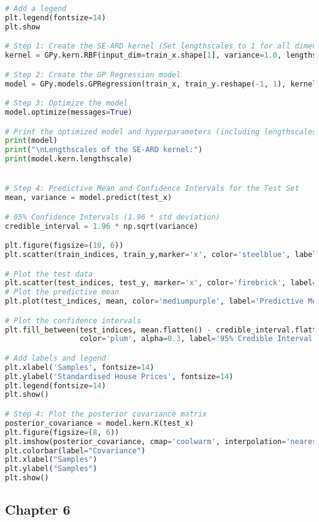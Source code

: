 \documentclass[12pt,a4paper]{article}
\begin{document}
\begin{lstlisting}[language=python, caption={Code of the Creation of Figure \ref{fig:SE-ARD categorical plots}}]
# Add a legend
plt.legend(fontsize=14)
plt.show

# Step 1: Create the SE-ARD kernel (Set lengthscales to 1 for all dimensions)
kernel = GPy.kern.RBF(input_dim=train_x.shape[1], variance=1.0, lengthscale=np.full(train_x.shape[1], 1), ARD=True)

# Step 2: Create the GP Regression model
model = GPy.models.GPRegression(train_x, train_y.reshape(-1, 1), kernel)

# Step 3: Optimize the model
model.optimize(messages=True)

# Print the optimized model and hyperparameters (including lengthscales)
print(model)
print("\nLengthscales of the SE-ARD kernel:")
print(model.kern.lengthscale)


# Step 4: Predictive Mean and Confidence Intervals for the Test Set
mean, variance = model.predict(test_x)

# 95% Confidence Intervals (1.96 * std deviation)
credible_interval = 1.96 * np.sqrt(variance)

plt.figure(figsize=(10, 6))
plt.scatter(train_indices, train_y,marker='x', color='steelblue', label='Training Data', s=50)

# Plot the test data
plt.scatter(test_indices, test_y, marker='x', color='firebrick', label='Test Data', s=50)
# Plot the predictive mean
plt.plot(test_indices, mean, color='mediumpurple', label='Predictive Mean', linewidth=3)

# Plot the confidence intervals
plt.fill_between(test_indices, mean.flatten() - credible_interval.flatten(), mean.flatten() + credible_interval.flatten(),
                 color='plum', alpha=0.3, label='95% Credible Interval')

# Add labels and legend
plt.xlabel('Samples', fontsize=14)
plt.ylabel('Standardised House Prices', fontsize=14)
plt.legend(fontsize=14)
plt.show()

# Step 4: Plot the posterior covariance matrix
posterior_covariance = model.kern.K(test_x)
plt.figure(figsize=(8, 6))
plt.imshow(posterior_covariance, cmap='coolwarm', interpolation='nearest')
plt.colorbar(label="Covariance")
plt.xlabel("Samples")
plt.ylabel("Samples")
plt.show()
\end{lstlisting}


\subsection{Chapter 6}
\label{Chapter 6}
\end{document}
